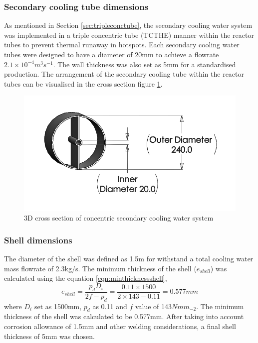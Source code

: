 \subsubsection{Secondary cooling tube dimensions}
As mentioned in Section \ref{sec:tripleconctube}, the secondary cooling water system was implemented in a triple concentric tube (TCTHE) manner within the reactor tubes to prevent thermal runaway in hotspots. Each secondary cooling water tubes were designed to have a diameter of 20mm to achieve a flowrate $2.1 \times 10^{-4} m^3 s^{-1}$. The wall thickness was also set as 5mm for a standardised production. 
The arrangement of the secondary cooling tube within the reactor tubes can be visualised in the cross section figure \ref{fig:concentriccoolingwater}. 
\begin{figure}[H]
    \centering
    \includegraphics[width=0.65\linewidth]{chapters/2-reaction/figures/FYD conc tube with calc bw.png} 
    \caption{3D cross section of concentric secondary cooling water system}
    \label{fig:concentriccoolingwater}
\end{figure}

\subsubsection{Shell dimensions}
The diameter of the shell was defined as 1.5m for withstand a total cooling water mass flowrate of 2.3kg/s.
The minimum thickness of the shell ($e_{shell}$) was calculated using the equation \ref{eqn:minthicknessshell},
\begin{equation}
    e_{shell} = \frac{p_dD_i}{2f-p_d} = \frac{0.11 \times 1500}{2 \times 143 - 0.11} = 0.577mm
    \label{eqn:minthicknessshell}
\end{equation}
where $D_i$ set as 1500mm, $p_d$ as 0.11 and $f$ value of 143$Nmm_{-2}$. The minimum thickness of the shell was calculated to be 0.577mm. After taking into account corrosion allowance of 1.5mm and other welding considerations, a final shell thickness of 5mm was chosen. 

